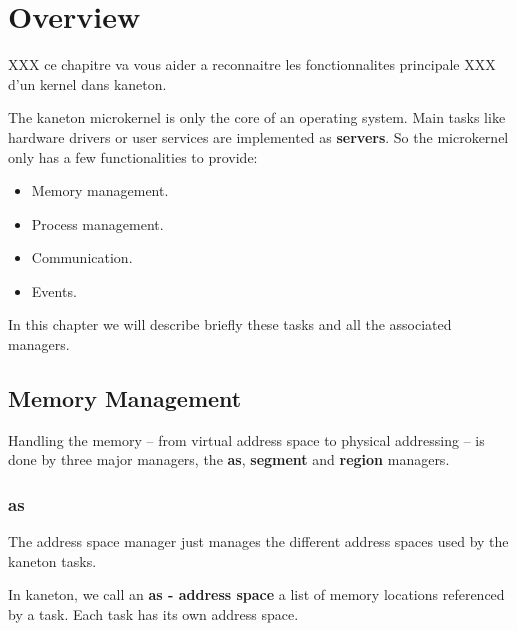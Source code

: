 
%
%

\chapter{Overview}

XXX ce chapitre va vous aider a reconnaitre les fonctionnalites principale
XXX d'un kernel dans kaneton.

The kaneton microkernel is only the core of an operating system.
Main tasks like hardware drivers or user services are implemented as
\textbf{servers}. So the microkernel only has a few functionalities to
provide:

\begin{itemize}
  \item
    Memory management.
  \item
    Process management.
  \item
    Communication.
  \item
    Events.
\end{itemize}

In this chapter we will describe briefly these tasks and all the
associated managers.

%
%

\section{Memory Management}

Handling the memory -- from virtual address space to physical
addressing -- is done by three major managers, the \textbf{as},
\textbf{segment} and \textbf{region} managers.

%
%

\subsection{as}

The address space manager just manages the different address spaces
used by the kaneton tasks.

In kaneton, we call an \textbf{as - address space} a list of memory
locations referenced by a task. Each task has its own address space.

